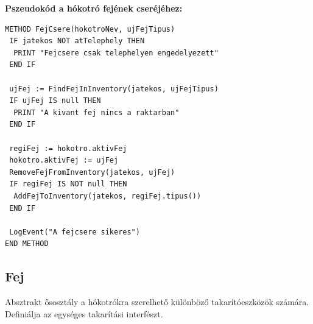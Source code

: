 \textbf{Pszeudokód a hókotró fejének cseréjéhez:}
\begin{verbatim}
METHOD FejCsere(hokotroNev, ujFejTipus)
 IF jatekos NOT atTelephely THEN
  PRINT "Fejcsere csak telephelyen engedelyezett"
 END IF

 ujFej := FindFejInInventory(jatekos, ujFejTipus)
 IF ujFej IS null THEN
  PRINT "A kivant fej nincs a raktarban"
 END IF

 regiFej := hokotro.aktivFej
 hokotro.aktivFej := ujFej
 RemoveFejFromInventory(jatekos, ujFej)
 IF regiFej IS NOT null THEN
  AddFejToInventory(jatekos, regiFej.tipus())
 END IF

 LogEvent("A fejcsere sikeres")
END METHOD
\end{verbatim}


\subsection{Fej}
\begin{class-template-responsibility}
    Absztrakt ősosztály a hókotrókra szerelhető különböző takarítóeszközök számára. Definiálja az egységes takarítási interfészt. 
\end{class-template-responsibility}
\begin{class-template-attribute}
\end{class-template-attribute}
\begin{class-template-method}
\end{class-template-method}


